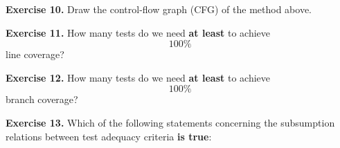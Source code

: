 \begin{Shaded}
\begin{Highlighting}[]
 \NormalTok{) \{}
     \NormalTok{();}
\NormalTok{    \}}
  
 
 
\NormalTok{;}
  
 \NormalTok{) \{}
  
  
   \NormalTok{) \{}
     
     
\NormalTok{      \}}
      \NormalTok{ \{}
     \NormalTok{, }\NormalTok{, }\NormalTok{);}
\NormalTok{      \}}
\NormalTok{    \}}
  \NormalTok{;}
\NormalTok{\}}
\end{Highlighting}
\end{Shaded}

\textbf{Exercise 10.} Draw the control-flow graph (CFG) of the method
above.

\textbf{Exercise 11.} How many tests do we need \textbf{at least} to
achieve \[100\%\] line coverage?

\textbf{Exercise 12.} How many tests do we need \textbf{at least} to
achieve \[100\%\] branch coverage?

\textbf{Exercise 13.} Which of the following statements concerning the
subsumption relations between test adequacy criteria \textbf{is true}:

